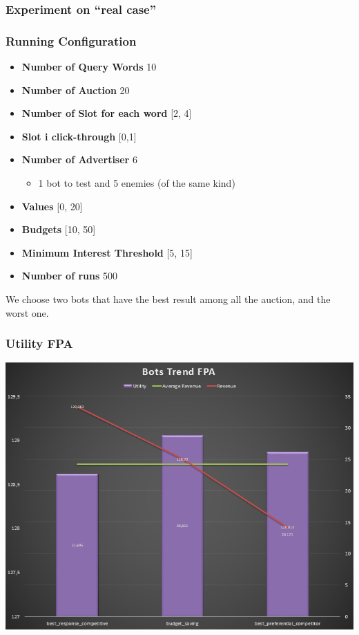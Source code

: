\documentclass{beamer}
\begin{document}
\subsubsection{Experiment on ``real case''}
\begin{frame}
\frametitle{Running Configuration}
\begin{itemize}
\item \textbf{Number of Query Words} 10
\item \textbf{Number of Auction} 20
\item \textbf{Number of Slot for each word} [2, 4]
\item \textbf{Slot i click-through } [0,1]
\item \textbf{Number of Advertiser} 6
\begin{itemize}
\item 1 bot to test and 5 enemies (of the same kind)
\end{itemize}
\item \textbf{Values} [0, 20]
\item \textbf{Budgets}  [10, 50]
\item \textbf{Minimum Interest Threshold} [5, 15]
\item \textbf{Number of runs } 500
\end{itemize}
We choose two bots that have the best result among all the auction, and the worst one.
\end{frame}

\begin{frame}
\frametitle{Utility FPA}
\begin{center}
\includegraphics[scale=0.46]{img/Auctions/RFPA_all_Utility.PNG} 
\end{center}
\end{frame}
\end{document}
